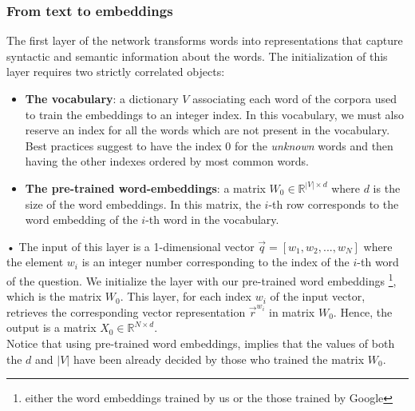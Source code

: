 \documentclass[10pt,twocolumn,letterpaper]{article}
\begin{document}
\subsubsection{From text to embeddings}
The first layer of the network transforms words into representations that capture syntactic and semantic information about the words. The initialization of this layer requires two strictly correlated objects:
\begin{itemize}
\item \textbf{The vocabulary}: a dictionary $V$ associating each word of the corpora used to train the embeddings to an integer index. In this vocabulary, we must also reserve an index for all the words which are not present in the vocabulary. Best practices suggest to have the index $0$ for the \emph{unknown} words and then having the other indexes ordered by most common words.
\item \textbf{The pre-trained word-embeddings}: a matrix $W_0 \in \mathbb{R}^{|V| \times d}$ where $d$ is the size of the word embeddings. In this matrix, the $i$-th row corresponds to the word embedding of the $i$-th word in the vocabulary.
\end{itemize}•
The input of this layer is a 1-dimensional vector $\vec{q}=[w_1, w_2, ... , w_N]$ where the element $w_i$ is an integer number corresponding to the index of the $i$-th word of the question. We initialize the layer with our pre-trained word embeddings \footnote{either the word embeddings trained by us or the those trained by Google}, which is the matrix $W_0$. This layer, for each index $w_i$ of the input vector, retrieves the corresponding vector representation $\vec{r}^{w_i}$ in matrix $W_0$. Hence, the output is a matrix $X_0 \in \mathbb{R}^{N \times d}$.\\
Notice that using pre-trained word embeddings, implies that the values of both the $d$ and $|V|$ have been already decided by those who trained the matrix $W_0$.
\end{document}
